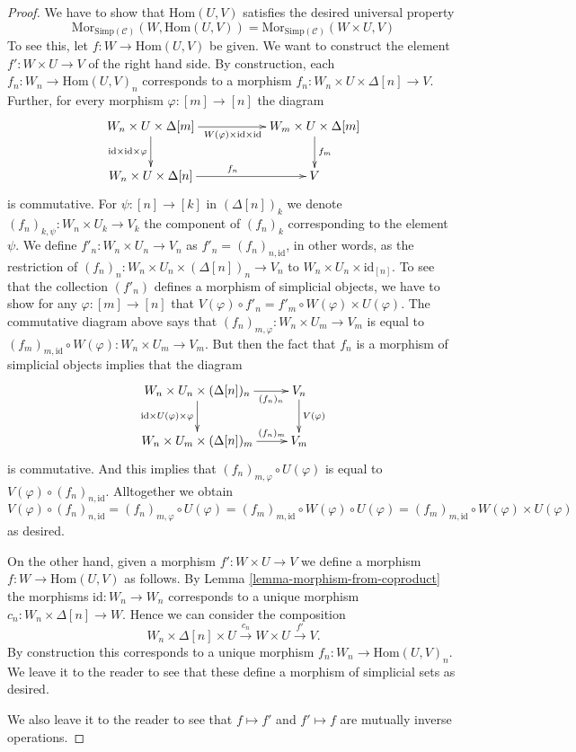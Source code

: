 \begin{proof}
\medskip\noindent
We have to show that $\text{Hom}(U, V)$ satisfies the desired
universal property
$$
\text{Mor}_{\text{Simp}(\mathcal{C})}(W, \text{Hom}(U, V))
=
\text{Mor}_{\text{Simp}(\mathcal{C})}(W \times U, V)
$$
To see this, let $f : W \to \text{Hom}(U, V)$ be given.
We want to construct the element $f' : W \times U \to V$
of the right hand side.
By construction, each $f_n : W_n \to \text{Hom}(U, V)_n$
corresponds to a morphism
$f_n : W_n \times U \times \Delta[n] \to V$. Further,
for every morphism $\varphi : [m] \to [n]$ the
diagram
$$
\xymatrix{
W_n \times U \times \Delta[m]
\ar[rr]_{W(\varphi)\times \text{id} \times \text{id}}
\ar[d]_{\text{id} \times \text{id} \times \varphi} & &
W_m \times U \times \Delta[m] \ar[d]^{f_m} \\
W_n \times U \times \Delta[n] \ar[rr]^{f_n} & & V
}
$$
is commutative. For $\psi : [n] \to [k]$ in $(\Delta[n])_k$
we denote $(f_n)_{k, \psi} : W_n \times U_k \to V_k$
the component of $(f_n)_k$ corresponding to the element
$\psi$. We define $f'_n : W_n \times U_n \to V_n$
as $f'_n = (f_n)_{n, \text{id}}$, in other words, as
the restriction of
$(f_n)_n : W_n \times U_n \times (\Delta[n])_n \to V_n$
to $W_n \times U_n \times \text{id}_{[n]}$.
To see that the collection $(f'_n)$ defines a
morphism of simplicial objects, we have to show
for any $\varphi : [m] \to [n]$ that
$V(\varphi) \circ f'_n =
f'_m \circ W(\varphi) \times U(\varphi)$.
The commutative diagram above says that
$(f_n)_{m, \varphi} : W_n \times U_m \to V_m$
is equal to
$(f_m)_{m, \text{id}} \circ W(\varphi) :
W_n \times U_m \to V_m$.
But then the fact that $f_n$ is a morphism of simplicial
objects implies that the diagram
$$
\xymatrix{
W_n \times U_n \times (\Delta[n])_n
\ar[r]_-{(f_n)_n}
\ar[d]_{\text{id}\times U(\varphi) \times \varphi}
& V_n \ar[d]^{V(\varphi)} \\
W_n \times U_m \times (\Delta[n])_m \ar[r]^-{(f_n)_m} & V_m
}
$$
is commutative. And this implies that
$(f_n)_{m, \varphi} \circ U(\varphi)$ is
equal to $V(\varphi) \circ (f_n)_{n, \text{id}}$.
Alltogether we obtain
$
V(\varphi) \circ (f_n)_{n, \text{id}}
=
(f_n)_{m, \varphi} \circ U(\varphi)
=
(f_m)_{m, \text{id}} \circ W(\varphi)\circ U(\varphi)
=
(f_m)_{m, \text{id}} \circ W(\varphi)\times U(\varphi)
$
as desired.

\medskip\noindent
On the other hand, given a morphism
$f' : W \times U \to V$ we define
a morphism $f : W \to \text{Hom}(U, V)$
as follows. By Lemma \ref{lemma-morphism-from-coproduct} the morphisms
$\text{id} : W_n \to W_n$ corresponds to a unique
morphism $c_n : W_n \times \Delta[n] \to W$.
Hence we can consider the composition
$$
W_n \times \Delta[n] \times U
\xrightarrow{c_n}
W \times U
\xrightarrow{f'}
V.
$$
By construction this corresponds to a unique morphism
$f_n : W_n \to \text{Hom}(U, V)_n$. We leave it to the reader
to see that these define a morphism of simplicial sets as
desired.

\medskip\noindent
We also leave it to the reader to see that
$f \mapsto f'$ and $f' \mapsto f$ are mutually inverse
operations.
\end{proof}

